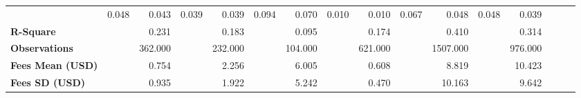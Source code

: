 \begin{tabular}{@{\extracolsep{5pt}}lrrrrrrrrrrrrrrr}
{\bf } & 0.048\phantom{***} & 0.043\phantom{***} & 0.039\phantom{***} & 0.039\phantom{***} & 0.094\phantom{***} & 0.070\phantom{***} & 0.010\phantom{***} & 0.010\phantom{***} & 0.067\phantom{***} & 0.048\phantom{***} & 0.048\phantom{***} & 0.039\phantom{***} \\
{\bf R-Square} & \phantom{***} & 0.231\phantom{***} & \phantom{***} & 0.183\phantom{***} & \phantom{***} & 0.095\phantom{***} & \phantom{***} & 0.174\phantom{***} & \phantom{***} & 0.410\phantom{***} & \phantom{***} & 0.314\phantom{***} \\
{\bf Observations} & \phantom{***} & 362.000\phantom{***} & \phantom{***} & 232.000\phantom{***} & \phantom{***} & 104.000\phantom{***} & \phantom{***} & 621.000\phantom{***} & \phantom{***} & 1507.000\phantom{***} & \phantom{***} & 976.000\phantom{***} \\
{\bf Fees Mean (USD)} & \phantom{***} & 0.754\phantom{***} & \phantom{***} & 2.256\phantom{***} & \phantom{***} & 6.005\phantom{***} & \phantom{***} & 0.608\phantom{***} & \phantom{***} & 8.819\phantom{***} & \phantom{***} & 10.423\phantom{***} \\
{\bf Fees SD (USD)} & \phantom{***} & 0.935\phantom{***} & \phantom{***} & 1.922\phantom{***} & \phantom{***} & 5.242\phantom{***} & \phantom{***} & 0.470\phantom{***} & \phantom{***} & 10.163\phantom{***} & \phantom{***} & 9.642\phantom{***} \\
\hline
\end{tabular}
